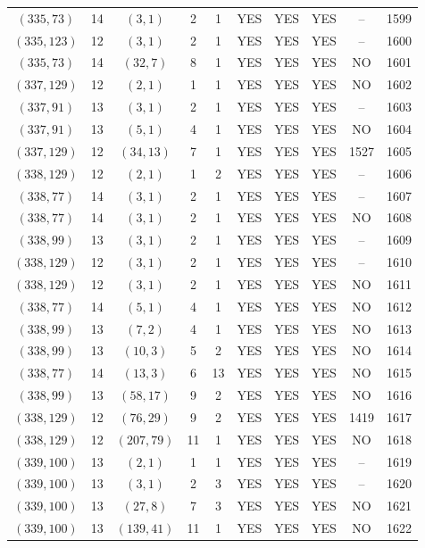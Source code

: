 \begin{longtable}{|c|c|c|c|c|c|c|c|c|c|}
$(335, 73)$ & 14 & $(3, 1)$ & 2 & 1 & YES & YES & YES & -- & 1599\\
$(335, 123)$ & 12 & $(3, 1)$ & 2 & 1 & YES & YES & YES & -- & 1600\\
$(335, 73)$ & 14 & $(32, 7)$ & 8 & 1 & YES & YES & YES & NO & 1601\\
$(337, 129)$ & 12 & $(2, 1)$ & 1 & 1 & YES & YES & YES & NO & 1602\\
$(337, 91)$ & 13 & $(3, 1)$ & 2 & 1 & YES & YES & YES & -- & 1603\\
$(337, 91)$ & 13 & $(5, 1)$ & 4 & 1 & YES & YES & YES & NO & 1604\\
$(337, 129)$ & 12 & $(34, 13)$ & 7 & 1 & YES & YES & YES & 1527 & 1605\\
$(338, 129)$ & 12 & $(2, 1)$ & 1 & 2 & YES & YES & YES & -- & 1606\\
$(338, 77)$ & 14 & $(3, 1)$ & 2 & 1 & YES & YES & YES & -- & 1607\\
$(338, 77)$ & 14 & $(3, 1)$ & 2 & 1 & YES & YES & YES & NO & 1608\\
$(338, 99)$ & 13 & $(3, 1)$ & 2 & 1 & YES & YES & YES & -- & 1609\\
$(338, 129)$ & 12 & $(3, 1)$ & 2 & 1 & YES & YES & YES & -- & 1610\\
$(338, 129)$ & 12 & $(3, 1)$ & 2 & 1 & YES & YES & YES & NO & 1611\\
$(338, 77)$ & 14 & $(5, 1)$ & 4 & 1 & YES & YES & YES & NO & 1612\\
$(338, 99)$ & 13 & $(7, 2)$ & 4 & 1 & YES & YES & YES & NO & 1613\\
$(338, 99)$ & 13 & $(10, 3)$ & 5 & 2 & YES & YES & YES & NO & 1614\\
$(338, 77)$ & 14 & $(13, 3)$ & 6 & 13 & YES & YES & YES & NO & 1615\\
$(338, 99)$ & 13 & $(58, 17)$ & 9 & 2 & YES & YES & YES & NO & 1616\\
$(338, 129)$ & 12 & $(76, 29)$ & 9 & 2 & YES & YES & YES & 1419 & 1617\\
$(338, 129)$ & 12 & $(207, 79)$ & 11 & 1 & YES & YES & YES & NO & 1618\\
$(339, 100)$ & 13 & $(2, 1)$ & 1 & 1 & YES & YES & YES & -- & 1619\\
$(339, 100)$ & 13 & $(3, 1)$ & 2 & 3 & YES & YES & YES & -- & 1620\\
$(339, 100)$ & 13 & $(27, 8)$ & 7 & 3 & YES & YES & YES & NO & 1621\\
$(339, 100)$ & 13 & $(139, 41)$ & 11 & 1 & YES & YES & YES & NO & 1622\\

\end{longtable}

